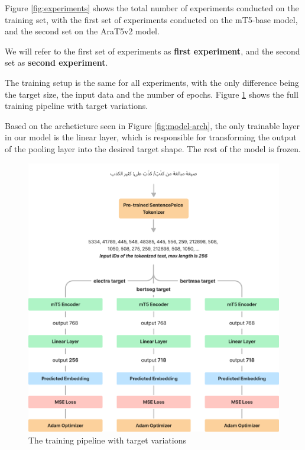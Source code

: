 \documentclass[12pt]{article}
\begin{document}
Figure \ref{fig:experiments} shows the total number of experiments conducted on the training set, with the first set of experiments conducted on the mT5-base model, and the second set on the AraT5v2 model.

We will refer to the first set of experiments as \textbf{first experiment}, and the second set as \textbf{second experiment}.

The training setup is the same for all experiments, with the only difference being the target size, the input data and the number of epochs. Figure \ref{fig:training} shows the full training pipeline with target variations.

Based on the archeticture seen in Figure \ref{fig:model-arch}, the only trainable layer in our model is the linear layer, which is responsible for transforming the output of the pooling layer into the desired target shape. The rest of the model is frozen.

\begin{figure}[H]
    \centering
    \captionsetup{justification=centering}
    \includegraphics[width=\textwidth]{training.png}
    \caption{The training pipeline with target variations}
    \label{fig:training}
\end{figure}
\end{document}
